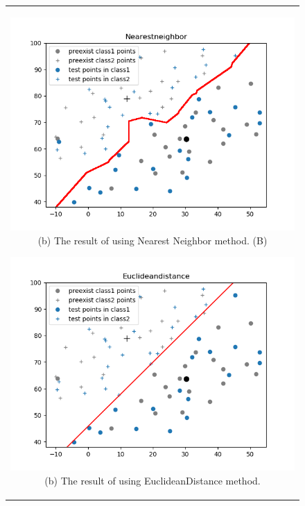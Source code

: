 \documentclass[10.5pt]{jsarticle}
\begin{document}
\begin{figure}[htbp]
  \centering
  \begin{tabular}{c}
  	\begin{minipage}{0.56\hsize}
  	\centering
  		\includegraphics[width=15.0cm, bb=9 9 700 270]{results/NearestneighborResultFigureB.png}
  		\hspace{0cm} (b) The result of using Nearest Neighbor method. (B)
  	\end{minipage}

  	\begin{minipage}{0.5\hsize}
  	\centering
  		\includegraphics[width=15.0cm, bb=9 9 700 270]{results/EuclideandistanceResultFigureB.png}
  		\hspace{0cm} (b) The result of using EuclideanDistance method.
  	\end{minipage}
  \end{tabular}
\end{figure}
\end{document}
